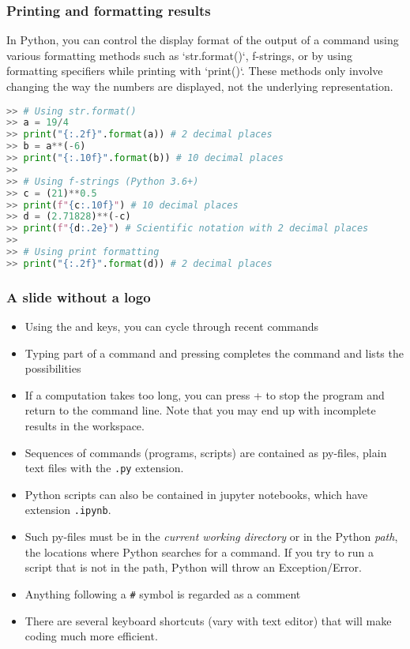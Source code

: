  \begin{frame}[fragile]
  \frametitle{Printing and formatting results}
  In Python, you can control the display format of the output of a command using various formatting methods such as `str.format()`, f-strings, or by using formatting specifiers while printing with `print()`. These methods only involve changing the way the numbers are displayed, not the underlying representation.
  
  \begin{lstlisting}[language=Python,numbers=none]
>> # Using str.format()
>> a = 19/4
>> print("{:.2f}".format(a)) # 2 decimal places
>> b = a**(-6)
>> print("{:.10f}".format(b)) # 10 decimal places
>> 
>> # Using f-strings (Python 3.6+)
>> c = (21)**0.5
>> print(f"{c:.10f}") # 10 decimal places
>> d = (2.71828)**(-c) 
>> print(f"{d:.2e}") # Scientific notation with 2 decimal places
>> 
>> # Using print formatting
>> print("{:.2f}".format(d)) # 2 decimal places
  \end{lstlisting}
\end{frame}

 
 {\nologo
 \begin{frame}[fragile]
  \frametitle{A slide without a logo}
  \begin{itemize}
    \item Using the \keystroke{$\uparrow$} and \keystroke{$\downarrow$} keys, you can cycle through recent commands
    \item Typing part of a command and pressing  completes the command and lists the possibilities
    \item If a computation takes too long, you can press + to stop the program and return to the command line. Note that you may end up with incomplete results in the workspace.
    \item Sequences of commands (programs, scripts) are contained as py-files, plain text files with the \lstinline$.py$ extension.
    \item Python scripts can also be contained in jupyter notebooks, which have extension \lstinline$.ipynb$.
    \item Such py-files must be in the \emph{current working directory} or in the Python \emph{path}, the locations where Python searches for a command. If you try to run a script that is not in the path, Python will throw an Exception/Error.
    \item Anything following a \lstinline$#$ symbol is regarded as a comment
    \item There are several keyboard shortcuts (vary with text editor) that will make coding much more efficient.
  \end{itemize}
\end{frame}
}
